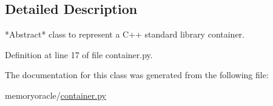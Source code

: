\subsection{Detailed Description}
\begin{DoxyVerb}*Abstract* class to represent a C++ standard library
container.
\end{DoxyVerb}
 

Definition at line 17 of file container.\+py.



The documentation for this class was generated from the following file\+:\begin{DoxyCompactItemize}
\item 
memoryoracle/\hyperlink{container_8py}{container.\+py}\end{DoxyCompactItemize}
